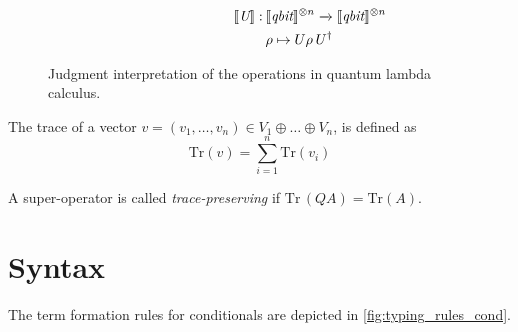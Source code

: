\begin{figure}[H]
\begin{equation*}
\begin{split}
\begin{aligned}
  \hspace{118pt}
  \begin{minipage}[t]{0.45\textwidth}
  $\begin{aligned}
    [\![\textit{U} ]\!] : \hspace{2pt} & \llbracket \textit{qbit} \rrbracket^{\otimes n} \xrightarrow{} \llbracket 
    \textit{qbit} \rrbracket^{\otimes n} \\
    & \rho \mapsto U \rho \hspace{2pt}  U^{\dag}
  \end{aligned}$
  \end{minipage} \\
  \end{aligned}
  \end{split}
  \end{equation*}
  \caption{Judgment interpretation of the operations in quantum lambda calculus.}
  \label{fig:interpret_ops}
  \end{figure}

 \begin{definition} \label{def:trace_direct_sum}
  The trace of a vector $v = (v_1, \ldots, v_n) \in V_1 \oplus \ldots \oplus V_n$, is defined as 
\begin{equation}
  \text{Tr}(v)=\sum_{i=1}^{n} \text{Tr}(v_i)
\end{equation}
 \end{definition}
 \begin{definition}\label{def:trace_preserving_direct_sum}
  A super-operator is called \emph{trace-preserving} if $\text{Tr} \hspace{2pt} (Q A)= \text{Tr} (A)$.
 \end{definition}
  



\section{Syntax}

The term formation rules for conditionals are depicted in
\autoref{fig:typing_rules_cond}. 

